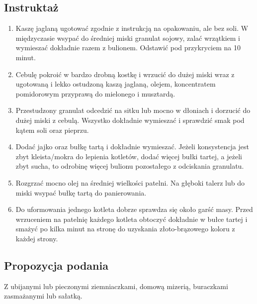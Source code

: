 \subsection*{Instruktaż}
\begin{enumerate}
    \item Kaszę jaglaną ugotować zgodnie z instrukcją na opakowaniu, ale bez soli. W międzyczasie wsypać do średniej miski granulat sojowy, zalać wrzątkiem i wymieszać dokładnie razem z bulionem. Odstawić pod przykryciem na 10 minut.
    \item Cebulę pokroić w bardzo drobną kostkę i wrzucić do dużej miski wraz z ugotowaną i lekko ostudzoną kaszą jaglaną, olejem, koncentratem pomidorowym przyprawą do mielonego i musztardą.
    \item Przestudzony granulat odcedzić na sitku lub mocno w dłoniach i dorzucić do dużej miski z cebulą. Wszystko dokładnie wymieszać i sprawdzić smak pod kątem soli oraz pieprzu.
    \item Dodać jajko oraz bułkę tartą i dokładnie wymieszać. Jeżeli konsystencja jest zbyt kleista/mokra do lepienia kotletów, dodać więcej bułki tartej, a jeżeli zbyt sucha, to odrobinę więcej bulionu pozostałego z odciskania granulatu.
    \item Rozgrzać mocno olej na średniej wielkości patelni. Na głęboki talerz lub do miski wsypać bułkę tartą do panierowania.
    \item Do uformowania jednego kotleta dobrze sprawdza się około garść masy. Przed wrzuceniem na patelnię każdego kotleta obtoczyć dokładnie w bułce tartej i smażyć po kilka minut na stronę do uzyskania złoto-brązowego koloru z każdej strony.
\end{enumerate}

\vspace{0.5cm}

\small
\subsection*{Propozycja podania}
Z ubijanymi lub pieczonymi ziemniaczkami, domową mizerią, buraczkami zasmażanymi lub sałatką.

\vspace{0.3cm}

